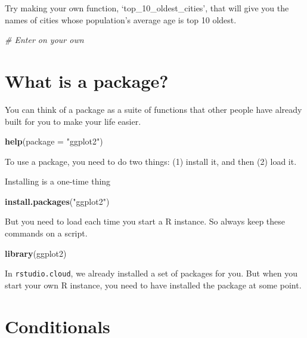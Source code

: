 \documentclass[]{book}
\newenvironment{Shaded}{\begin{snugshade}}{\end{snugshade}}
\newcommand{\KeywordTok}[1]{\textcolor[rgb]{0.13,0.29,0.53}{\textbf{#1}}}
\newcommand{\DataTypeTok}[1]{\textcolor[rgb]{0.13,0.29,0.53}{#1}}
\newcommand{\StringTok}[1]{\textcolor[rgb]{0.31,0.60,0.02}{#1}}
\newcommand{\CommentTok}[1]{\textcolor[rgb]{0.56,0.35,0.01}{\textit{#1}}}
\newcommand{\NormalTok}[1]{#1}
\theoremstyle{definition}
\theoremstyle{definition}
\theoremstyle{definition}
\theoremstyle{remark}
\begin{document}
Try making your own function, `top\_10\_oldest\_cities', that will give
you the names of cities whose population's average age is top 10 oldest.

\begin{Shaded}
\begin{Highlighting}[]
\CommentTok{# Enter on your own}
\end{Highlighting}
\end{Shaded}

\section{What is a package?}\label{what-is-a-package}

You can think of a package as a suite of functions that other people
have already built for you to make your life easier.

\begin{Shaded}
\begin{Highlighting}[]
\KeywordTok{help}\NormalTok{(}\DataTypeTok{package =} \StringTok{"ggplot2"}\NormalTok{)}
\end{Highlighting}
\end{Shaded}

To use a package, you need to do two things: (1) install it, and then
(2) load it.

Installing is a one-time thing

\begin{Shaded}
\begin{Highlighting}[]
\KeywordTok{install.packages}\NormalTok{(}\StringTok{"ggplot2"}\NormalTok{)}
\end{Highlighting}
\end{Shaded}

But you need to load each time you start a R instance. So always keep
these commands on a script.

\begin{Shaded}
\begin{Highlighting}[]
\KeywordTok{library}\NormalTok{(ggplot2)}
\end{Highlighting}
\end{Shaded}

In \texttt{rstudio.cloud}, we already installed a set of packages for
you. But when you start your own R instance, you need to have installed
the package at some point.

\section{Conditionals}\label{conditionals}
\end{document}
